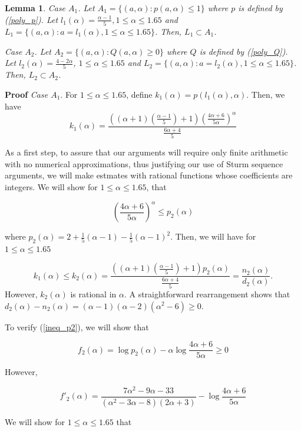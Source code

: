 \documentclass[12pt]{article}
\newcommand{\ds}{\displaystyle}
\newtheorem{lemma}[theorem]{Lemma}
\begin{document}
\begin{lemma}
Case $A_1$. Let $A_1 = \{(a,\alpha) : p(a,\alpha) \le 1\}$ where $p$ is defined by (\ref{poly_p}).  
Let ${\ds l_1(\alpha) = \frac{\alpha-1}{5}, 1 \le \alpha \le 1.65}$ and 
$L_1 = \{(a,\alpha) : a = l_1(\alpha), 1 \le \alpha \le 1.65\}$.  Then, $L_1 \subset  A_1$. 

Case $A_2$. Let $A_2 = \{(a,\alpha) : Q(a,\alpha) \ge 0\}$ where $Q$ is defined by (\ref{poly_Q}).  
Let ${\ds l_2(\alpha) = \frac{4-2\alpha}{5} }$, ${\ds 1 \le \alpha \le 1.65}$ and 
$L_2 = \{(a,\alpha) : a = l_2(\alpha), 1 \le \alpha \le 1.65\}$.  Then, $L_2 \subset A_2$.
\end{lemma}

\textbf{Proof} \emph{Case $A_1$}. For $1 \le \alpha \le 1.65$, define $k_1(\alpha) = p(l_1(\alpha),\alpha)$.  
Then, we have
$$
{\ds k_1(\alpha) = \frac{((\alpha+1)(\frac{\alpha-1}{5})+1)\left ( \frac{4\alpha+6}{5\alpha}\right)^{\alpha}}{\frac{6\alpha+4}{5}} }
$$

\noindent As a first step, to assure that our arguments will require only finite arithmetic with no numerical approximations, thus justifying our use of Sturm sequence arguments, we will make estmates with rational functions whose coefficients are integers.  We will show for $1 \le \alpha \le 1.65$, that 

\begin{equation} \label {ineq_p2}
\left (\frac{4\alpha+6}{5\alpha} \right )^{\alpha} \le p_2(\alpha)
\end{equation}

\noindent where 
${\ds p_2(\alpha) = 2 + \frac{1}{5}(\alpha-1) - \frac{1}{5}(\alpha-1)^2}$.  Then, we will have for $1 \le \alpha \le 1.65$ 

$$
k_1(\alpha) \le k_2(\alpha) = \frac{((\alpha+1)(\frac{\alpha-1}{5})+1)p_2(\alpha) }{\frac{6\alpha+4}{5}} = \frac{n_2(\alpha)}{d_2(\alpha)}.
$$
However, $k_2(\alpha)$ is rational in $\alpha$. A straightforward rearrangement shows that 
$d_2(\alpha) - n_2(\alpha) = (\alpha-1)(\alpha-2)(\alpha^2-6) \ge 0$.  

To verify (\ref{ineq_p2}), we will show 
that 

$$ 
f_2(\alpha) = \log p_2(\alpha) - \alpha \log \frac{4\alpha+6}{5\alpha}  \ge 0
$$

\noindent However, 

$$
f'_2(\alpha) = \frac{7\alpha^2-9\alpha-33}{(\alpha^2-3\alpha-8)(2\alpha+3)}  - \log \frac{4\alpha+6}{5\alpha}
$$

\noindent We will show for $1 \le \alpha \le 1.65$ that
\end{document}
